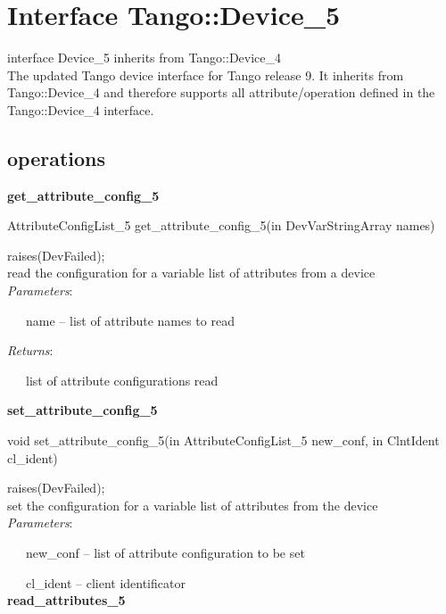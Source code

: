 \section{Interface Tango::Device\_5}

interface Device\_5 inherits from Tango::Device\_4\\


The updated Tango device interface for Tango release 9. It inherits
from Tango::Device\_4 and therefore supports all attribute/operation
defined in the Tango::Device\_4 interface.


\subsection{operations}

\textbf{get\_attribute\_config\_5}

AttributeConfigList\_5 get\_attribute\_config\_5(in DevVarStringArray
names)

raises(DevFailed);\\


read the configuration for a variable list of attributes from a device\\


\emph{Parameters}:

~~~name -- list of attribute names to read

\emph{Returns}:

~~~list of attribute configurations read\\


\begin{flushleft}
\textbf{set\_attribute\_config\_5}
\par\end{flushleft}

void set\_attribute\_config\_5(in AttributeConfigList\_5 new\_conf,
in ClntIdent cl\_ident)

raises(DevFailed);\\


set the configuration for a variable list of attributes from the device\\


\emph{Parameters}:

~~~new\_conf -- list of attribute configuration to be set

~~~cl\_ident -- client identificator\\


\textbf{read\_attributes\_5}

